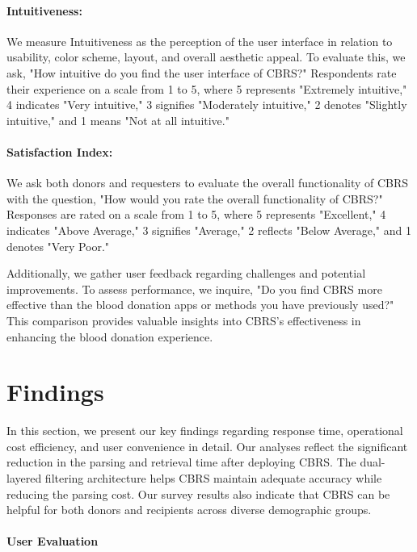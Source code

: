 \documentclass[11pt]{article}
\begin{document}
\paragraph{Intuitiveness:}
We measure Intuitiveness as the perception of the user interface in relation to usability, color scheme, layout, and overall aesthetic appeal. To evaluate this, we ask, "How intuitive do you find the user interface of CBRS?" Respondents rate their experience on a scale from 1 to 5, where 5 represents "Extremely intuitive," 4 indicates "Very intuitive," 3 signifies "Moderately intuitive," 2 denotes "Slightly intuitive," and 1 means "Not at all intuitive."

\paragraph{Satisfaction Index:}
We ask both donors and requesters to evaluate the overall functionality of CBRS with the question, "How would you rate the overall functionality of CBRS?" Responses are rated on a scale from 1 to 5, where 5 represents "Excellent," 4 indicates "Above Average," 3 signifies "Average," 2 reflects "Below Average," and 1 denotes "Very Poor." 

Additionally, we gather user feedback regarding challenges and potential improvements. To assess performance, we inquire, "Do you find CBRS more effective than the blood donation apps or methods you have previously used?" This comparison provides valuable insights into CBRS's effectiveness in enhancing the blood donation experience.







\section{Findings}\label{appendix:E}
In this section, we present our key findings regarding response time, operational cost efficiency, and user convenience in detail. Our analyses reflect the significant reduction in the parsing and retrieval time after deploying CBRS. The dual-layered filtering architecture helps CBRS maintain adequate accuracy while reducing the parsing cost. Our survey results also indicate that CBRS can be helpful for both donors and recipients across diverse demographic groups.

\paragraph{User Evaluation}
\end{document}
